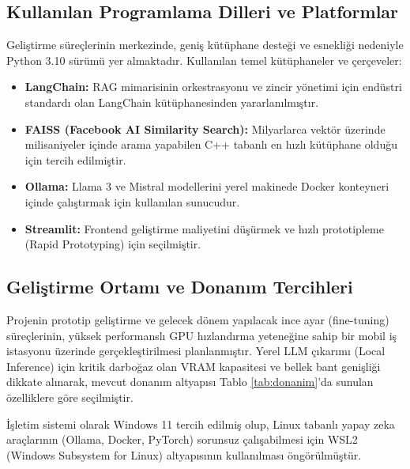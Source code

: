 \documentclass[12pt,a4paper]{report}
\begin{document}
\subsection{Kullanılan Programlama Dilleri ve Platformlar}
Geliştirme süreçlerinin merkezinde, geniş kütüphane desteği ve esnekliği nedeniyle Python 3.10 sürümü yer almaktadır. Kullanılan temel kütüphaneler ve çerçeveler:
\begin{itemize}
    \item \textbf{LangChain:} RAG mimarisinin orkestrasyonu ve zincir yönetimi için endüstri standardı olan LangChain kütüphanesinden yararlanılmıştır.
    \item \textbf{FAISS (Facebook AI Similarity Search):} Milyarlarca vektör üzerinde milisaniyeler içinde arama yapabilen C++ tabanlı en hızlı kütüphane olduğu için tercih edilmiştir.
    \item \textbf{Ollama:} Llama 3 ve Mistral modellerini yerel makinede Docker konteyneri içinde çalıştırmak için kullanılan sunucudur.
    \item \textbf{Streamlit:} Frontend geliştirme maliyetini düşürmek ve hızlı prototipleme (Rapid Prototyping) için seçilmiştir.
\end{itemize}

\subsection{Geliştirme Ortamı ve Donanım Tercihleri}
Projenin prototip geliştirme ve gelecek dönem yapılacak ince ayar (fine-tuning) süreçlerinin, yüksek performanslı GPU hızlandırma yeteneğine sahip bir mobil iş istasyonu üzerinde gerçekleştirilmesi planlanmıştır. Yerel LLM çıkarımı (Local Inference) için kritik darboğaz olan VRAM kapasitesi ve bellek bant genişliği dikkate alınarak, mevcut donanım altyapısı Tablo \ref{tab:donanim}'da sunulan özelliklere göre seçilmiştir.

İşletim sistemi olarak Windows 11 tercih edilmiş olup, Linux tabanlı yapay zeka araçlarının (Ollama, Docker, PyTorch) sorunsuz çalışabilmesi için WSL2 (Windows Subsystem for Linux) altyapısının kullanılması öngörülmüştür.
\end{document}
